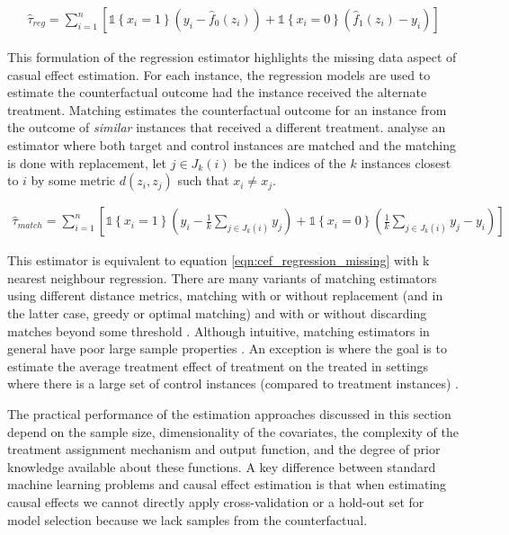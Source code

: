 \documentclass[11pt,a4paper,twoside]{report}
\newcommand{\set}[1]{\left\{#1\right\}}
\newcommand{\ind}[1]{\mathds{1}\!\!\set{#1}}
\newcommand{\eqn}[1]{\begin{align}#1\end{align}}
\theoremstyle{plain}
\theoremstyle{definition}
\begin{document}
\eqn{
\label{eqn:cef_regression_missing}
\hat{\tau}_{reg} = \sum_{i=1}^n \left[\ind{x_i=1}\left(y_i - \hat{f}_0(z_i)\right) +\ind{x_i=0}\left(\hat{f}_1(z_i) - y_i \right)\right]
}

This formulation of the regression estimator highlights the missing data aspect of casual effect estimation. For each instance, the regression models are used to estimate the counterfactual outcome had the instance received the alternate treatment. Matching estimates the counterfactual outcome for an instance from the outcome of \emph{similar} instances that received a different treatment. \citet{abadie2002simple} analyse an estimator where both target and control instances are matched and the matching is done with replacement, let $j \in J_k(i)$ be the indices of the $k$ instances closest to $i$ by some metric $d(z_i,z_j)$ such that $x_i \neq x_j$.

\eqn{
\hat{\tau}_{match} = \sum_{i=1}^n \left[\ind{x_i=1}\left(y_i - \frac{1}{k}\sum_{j \in J_k(i)}y_j\right) +\ind{x_i=0}\left(\frac{1}{k}\sum_{j \in J_k(i)}y_j - y_i \right)\right]
}

This estimator is equivalent to equation \ref{eqn:cef_regression_missing} with k nearest neighbour regression. There are many variants of matching estimators using different distance metrics, matching with or without replacement (and in the latter case, greedy or optimal matching) and with or without discarding matches beyond some threshold \citep{Cochran1973,rosenbaum1985constructing}. Although intuitive, matching estimators in general have poor large sample properties \citep{Abadie2006}. An exception is where the goal is to estimate the average treatment effect of treatment on the treated in settings where there is a large set of control instances (compared to treatment instances) \citep{Imbens2004}. 

The practical performance of the estimation approaches discussed in this section depend on the sample size, dimensionality of the covariates, the complexity of the treatment assignment mechanism and output function, and the degree of prior knowledge available about these functions. A key difference between standard machine learning problems and causal effect estimation is that when estimating causal effects we cannot directly apply cross-validation or a hold-out set for model selection because we lack samples from the counterfactual. 
\end{document}
